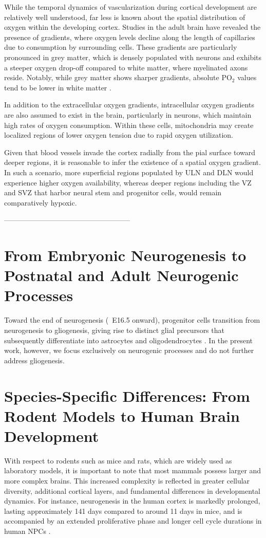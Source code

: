 While the temporal dynamics of vascularization during cortical development are relatively well understood, far less is known about the spatial distribution of oxygen within the developing cortex. Studies in the adult brain have revealed the presence of gradients, where oxygen levels decline along the length of capillaries due to consumption by surrounding cells. These gradients are particularly pronounced in grey matter, which is densely populated with neurons and exhibits a steeper oxygen drop-off compared to white matter, where myelinated axons reside. Notably, while grey matter shows sharper gradients, absolute PO$_2$ 
values tend to be lower in white matter \citep{erecinskaTissueOxygenTension2001}.

In addition to the extracellular oxygen gradients, intracellular oxygen gradients are also assumed to exist in the brain, particularly in neurons, which maintain high rates of oxygen consumption. Within these cells, mitochondria may create localized regions of lower oxygen tension due to rapid oxygen utilization.

Given that blood vessels invade the cortex radially from the pial surface toward deeper regions, it is reasonable to infer the existence of a spatial oxygen gradient. In such a scenario, more superficial regions populated by ULN and DLN would experience higher oxygen availability, whereas deeper regions including the VZ and SVZ that harbor neural stem and progenitor cells, would remain comparatively hypoxic. 

-----------------------------------------------------
\section{From Embryonic Neurogenesis to Postnatal and Adult Neurogenic Processes}
Toward the end of neurogenesis (~E16.5 onward), progenitor cells transition from neurogenesis to gliogenesis, giving rise to distinct glial precursors that subsequently differentiate into astrocytes and oligodendrocytes \citep{VIEIRANeuralStemCell2018}.
In the present work, however, we focus exclusively on neurogenic processes and do not further address gliogenesis.

\section{Species-Specific Differences: From Rodent Models to Human Brain Development}
With respect to rodents such as mice and rats, which are widely used as laboratory models, it is important to note that most mammals possess larger and more complex brains. This increased complexity is reflected in greater cellular diversity, additional cortical layers, and fundamental differences in developmental dynamics. For instance, neurogenesis in the human cortex is markedly prolonged, lasting approximately 141 days compared to around 11 days in mice, and is accompanied by an extended proliferative phase and longer cell cycle durations in human NPCs \citep{LIBE-PHILIPPOTCellularMolecularMechanisms2021}.

